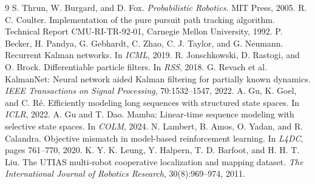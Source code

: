 \documentclass{article}
\begin{document}
\clearpage
\begin{thebibliography}{9}
\small
\setlength{\itemsep}{0pt}
\setlength{\parskip}{0pt}
S. Thrun, W. Burgard, and D. Fox. \emph{Probabilistic Robotics}. MIT Press, 2005.
R. C. Coulter. Implementation of the pure pursuit path tracking algorithm. Technical Report CMU-RI-TR-92-01, Carnegie Mellon University, 1992.
P. Becker, H. Pandya, G. Gebhardt, C. Zhao, C. J. Taylor, and G. Neumann. Recurrent Kalman networks. In \emph{ICML}, 2019.
R. Jonschkowski, D. Rastogi, and O. Brock. Differentiable particle filters. In \emph{RSS}, 2018.
G. Revach et al. KalmanNet: Neural network aided Kalman filtering for partially known dynamics. \emph{IEEE Transactions on Signal Processing}, 70:1532--1547, 2022.
A. Gu, K. Goel, and C. R\'e. Efficiently modeling long sequences with structured state spaces. In \emph{ICLR}, 2022.
A. Gu and T. Dao. Mamba: Linear-time sequence modeling with selective state spaces. In \emph{COLM}, 2024.
N. Lambert, B. Amos, O. Yadan, and R. Calandra. Objective mismatch in model-based reinforcement learning. In \emph{L4DC}, pages 761--770, 2020.
K. Y. K. Leung, Y. Halpern, T. D. Barfoot, and H. H. T. Liu. The UTIAS multi-robot cooperative localization and mapping dataset. \emph{The International Journal of Robotics Research}, 30(8):969--974, 2011.
\end{thebibliography}
\end{document}
